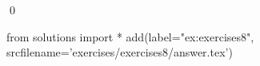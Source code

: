 
\begin{ex} 
  \label{ex:exercises8}
  
  \qed
\end{ex} 
\begin{python0}
from solutions import *
add(label="ex:exercises8",
    srcfilename='exercises/exercises8/answer.tex') 
\end{python0}
